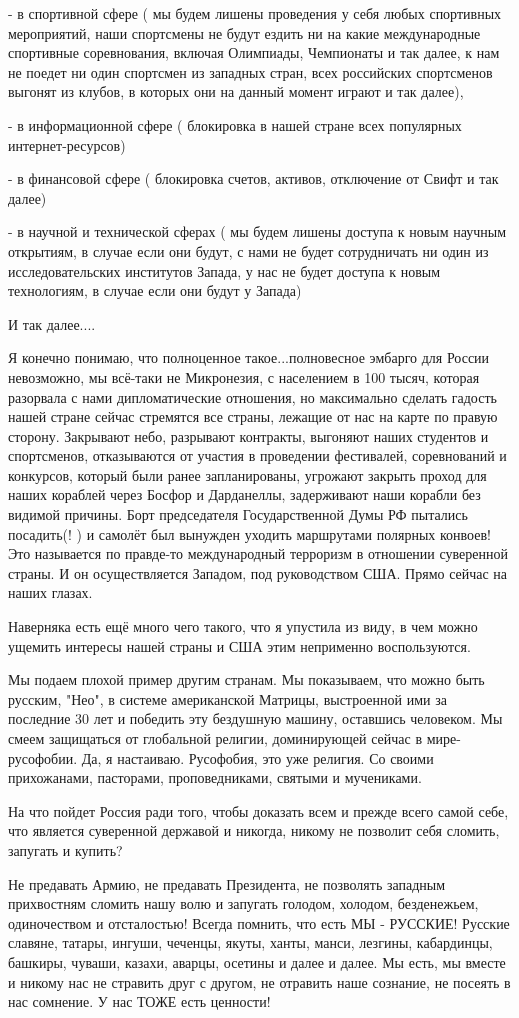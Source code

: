 - в спортивной сфере ( мы будем лишены проведения у себя любых спортивных
мероприятий, наши спортсмены не будут ездить ни на какие международные
спортивные соревнования, включая Олимпиады, Чемпионаты и так далее, к нам не
поедет ни один спортсмен из западных стран, всех российских спортсменов выгонят
из клубов, в которых они на данный момент играют и так далее),

- в информационной сфере ( блокировка в нашей стране всех популярных
интернет-ресурсов)

- в финансовой сфере ( блокировка счетов, активов, отключение от Свифт и так
далее)

- в научной и технической сферах ( мы будем лишены доступа к новым научным
открытиям, в случае если они будут, с нами не будет сотрудничать ни один из
исследовательских институтов Запада, у нас не будет доступа к новым технологиям,
в случае если они будут у Запада)

И так далее....

Я конечно понимаю, что полноценное такое...полновесное эмбарго для России
невозможно, мы всё-таки не Микронезия, с населением в 100 тысяч, которая
разорвала с нами дипломатические отношения, но максимально сделать гадость
нашей стране сейчас стремятся все страны, лежащие от нас на карте по правую
сторону. Закрывают небо, разрывают контракты, выгоняют наших студентов и
спортсменов, отказываются от участия в проведении фестивалей, соревнований и
конкурсов, который были ранее запланированы, угрожают закрыть проход для наших
кораблей через Босфор и Дарданеллы, задерживают наши корабли без видимой
причины. Борт председателя Государственной Думы РФ пытались посадить(! ) и
самолёт был вынужден уходить маршрутами полярных конвоев! Это называется по
правде-то международный терроризм в отношении суверенной страны. И он
осуществляется Западом, под руководством США. Прямо сейчас на наших глазах.


Наверняка есть ещё много чего такого, что я упустила из виду, в чем можно
ущемить интересы нашей страны и США этим неприменно воспользуются.

Мы подаем плохой пример другим странам. Мы показываем, что можно быть русским,
"Нео", в системе американской Матрицы, выстроенной ими за последние 30 лет и
победить эту бездушную машину, оставшись человеком. Мы смеем защищаться от
глобальной религии, доминирующей сейчас в мире-русофобии. Да, я настаиваю.
Русофобия, это уже религия. Со своими прихожанами, пасторами, проповедниками,
святыми и мучениками.

На что пойдет Россия ради того, чтобы доказать всем и прежде всего самой себе,
что является суверенной державой и никогда, никому не позволит себя сломить,
запугать и купить?

Не предавать Армию, не предавать Президента, не позволять западным прихвостням
сломить нашу волю и запугать голодом, холодом, безденежьем, одиночеством и
отсталостью! Всегда помнить, что есть МЫ - РУССКИЕ! Русские славяне, татары,
ингуши, чеченцы, якуты, ханты, манси, лезгины, кабардинцы, башкиры, чуваши,
казахи, аварцы, осетины и далее и далее. Мы есть, мы вместе и никому нас не
стравить друг с другом, не отравить наше сознание, не посеять в нас сомнение. У
нас ТОЖЕ есть ценности! 
